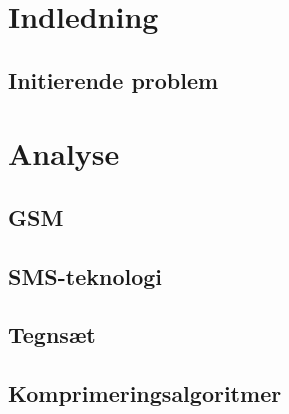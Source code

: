 \documentclass[12pt,a4paper]{report}
\begin{document}
\setcounter{page}{2}

\begin{titlepage}

\thispagestyle{empty}
\end{titlepage}

\newpage
\thispagestyle{empty}
\mbox{}



\newpage
\thispagestyle{empty}
\mbox{}

\tableofcontents
\thispagestyle{empty}

\renewcommand{\chaptername}{Kapitel}

\chapter{Indledning}
\setcounter{page}{3}
	
	\section{Initierende problem}
	

\chapter{Analyse}
 
    

    \section{GSM}
    

	\section{SMS-teknologi}
	
	
	\section{Tegnsæt}
	
	
	\section{Komprimeringsalgoritmer}
	
	
\end{document}
